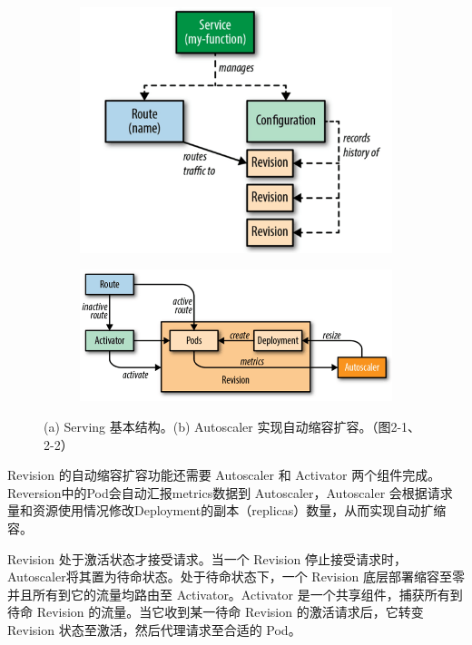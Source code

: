 \documentclass[11pt]{article}
\begin{document}
\begin{figure}[!htbp]
	\begin{subfigure}[b]{0.48\linewidth}
		\includegraphics[width=\linewidth]{figs/knative-serving.png}
		\caption{}
		\label{knative-serving}
	\end{subfigure}
	\begin{subfigure}[b]{0.52\linewidth}
		\includegraphics[width=\linewidth]{figs/knative-autoscaler.png}
		\caption{}
		\label{knative-autoscaler}
	\end{subfigure}
	\caption{(a) Serving 基本结构。(b) Autoscaler 实现自动缩容扩容。（\cite{mcclain2019getting}图2-1、2-2）}
\end{figure}

Revision 的自动缩容扩容功能还需要 Autoscaler 和 Activator 两个组件完成\cite{mcclain2019getting}。Reversion中的Pod会自动汇报metrics数据到 Autoscaler，Autoscaler 会根据请求量和资源使用情况修改Deployment的副本（replicas）数量，从而实现自动扩缩容。

Revision 处于激活状态才接受请求。当一个 Revision 停止接受请求时，Autoscaler将其置为待命状态。处于待命状态下，一个 Revision 底层部署缩容至零并且所有到它的流量均路由至 Activator。Activator 是一个共享组件，捕获所有到待命 Revision 的流量。当它收到某一待命 Revision 的激活请求后，它转变 Revision 状态至激活，然后代理请求至合适的 Pod。
\end{document}
